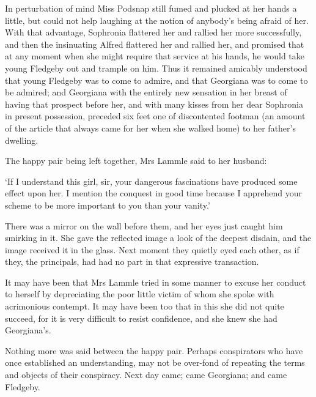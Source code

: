 In perturbation of mind Miss Podsnap still fumed and plucked at her
hands a little, but could not help laughing at the notion of anybody’s
being afraid of her. With that advantage, Sophronia flattered her and
rallied her more successfully, and then the insinuating Alfred flattered
her and rallied her, and promised that at any moment when she might
require that service at his hands, he would take young Fledgeby out and
trample on him. Thus it remained amicably understood that young Fledgeby
was to come to admire, and that Georgiana was to come to be admired; and
Georgiana with the entirely new sensation in her breast of having that
prospect before her, and with many kisses from her dear Sophronia in
present possession, preceded six feet one of discontented footman (an
amount of the article that always came for her when she walked home) to
her father’s dwelling.

The happy pair being left together, Mrs Lammle said to her husband:

‘If I understand this girl, sir, your dangerous fascinations have
produced some effect upon her. I mention the conquest in good time
because I apprehend your scheme to be more important to you than your
vanity.’

There was a mirror on the wall before them, and her eyes just caught
him smirking in it. She gave the reflected image a look of the deepest
disdain, and the image received it in the glass. Next moment they
quietly eyed each other, as if they, the principals, had had no part in
that expressive transaction.

It may have been that Mrs Lammle tried in some manner to excuse her
conduct to herself by depreciating the poor little victim of whom she
spoke with acrimonious contempt. It may have been too that in this she
did not quite succeed, for it is very difficult to resist confidence,
and she knew she had Georgiana’s.

Nothing more was said between the happy pair. Perhaps conspirators
who have once established an understanding, may not be over-fond of
repeating the terms and objects of their conspiracy. Next day came; came
Georgiana; and came Fledgeby.

